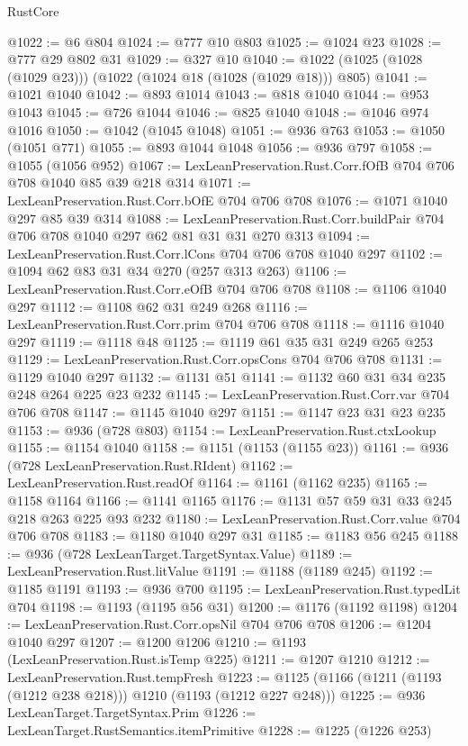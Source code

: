 \begin{lexlean}{RustCore}
\begin{coremodule}
@1022 := @6 @804
@1024 := @777 @10 @803
@1025 := @1024 @23
@1028 := @777 @29 @802 @31
@1029 := @327 @10
@1040 := @1022 (@1025 (@1028 (@1029 @23))) (@1022 (@1024 @18 (@1028 (@1029 @18))) @805)
@1041 := @1021 @1040
@1042 := @893 @1014
@1043 := @818 @1040
@1044 := @953 @1043
@1045 := @726 @1044
@1046 := @825 @1040
@1048 := @1046 @974 @1016
@1050 := @1042 (@1045 @1048)
@1051 := @936 @763
@1053 := @1050 (@1051 @771)
@1055 := @893 @1044 @1048
@1056 := @936 @797
@1058 := @1055 (@1056 @952)
@1067 := LexLeanPreservation.Rust.Corr.fOfB @704 @706 @708 @1040 @85 @39 @218 @314
@1071 := LexLeanPreservation.Rust.Corr.bOfE @704 @706 @708
@1076 := @1071 @1040 @297 @85 @39 @314
@1088 := LexLeanPreservation.Rust.Corr.buildPair @704 @706 @708 @1040 @297 @62 @81 @31 @31 @270 @313
@1094 := LexLeanPreservation.Rust.Corr.lCons @704 @706 @708 @1040 @297
@1102 := @1094 @62 @83 @31 @34 @270 (@257 @313 @263)
@1106 := LexLeanPreservation.Rust.Corr.eOfB @704 @706 @708
@1108 := @1106 @1040 @297
@1112 := @1108 @62 @31 @249 @268
@1116 := LexLeanPreservation.Rust.Corr.prim @704 @706 @708
@1118 := @1116 @1040 @297
@1119 := @1118 @48
@1125 := @1119 @61 @35 @31 @249 @265 @253
@1129 := LexLeanPreservation.Rust.Corr.opsCons @704 @706 @708
@1131 := @1129 @1040 @297
@1132 := @1131 @51
@1141 := @1132 @60 @31 @34 @235 @248 @264 @225 @23 @232
@1145 := LexLeanPreservation.Rust.Corr.var @704 @706 @708
@1147 := @1145 @1040 @297
@1151 := @1147 @23 @31 @23 @235
@1153 := @936 (@728 @803)
@1154 := LexLeanPreservation.Rust.ctxLookup
@1155 := @1154 @1040
@1158 := @1151 (@1153 (@1155 @23))
@1161 := @936 (@728 LexLeanPreservation.Rust.RIdent)
@1162 := LexLeanPreservation.Rust.readOf
@1164 := @1161 (@1162 @235)
@1165 := @1158 @1164
@1166 := @1141 @1165
@1176 := @1131 @57 @59 @31 @33 @245 @218 @263 @225 @93 @232
@1180 := LexLeanPreservation.Rust.Corr.value @704 @706 @708
@1183 := @1180 @1040 @297 @31
@1185 := @1183 @56 @245
@1188 := @936 (@728 LexLeanTarget.TargetSyntax.Value)
@1189 := LexLeanPreservation.Rust.litValue
@1191 := @1188 (@1189 @245)
@1192 := @1185 @1191
@1193 := @936 @700
@1195 := LexLeanPreservation.Rust.typedLit @704
@1198 := @1193 (@1195 @56 @31)
@1200 := @1176 (@1192 @1198)
@1204 := LexLeanPreservation.Rust.Corr.opsNil @704 @706 @708
@1206 := @1204 @1040 @297
@1207 := @1200 @1206
@1210 := @1193 (LexLeanPreservation.Rust.isTemp @225)
@1211 := @1207 @1210
@1212 := LexLeanPreservation.Rust.tempFresh
@1223 := @1125 (@1166 (@1211 (@1193 (@1212 @238 @218))) @1210 (@1193 (@1212 @227 @248)))
@1225 := @936 LexLeanTarget.TargetSyntax.Prim
@1226 := LexLeanTarget.RustSemantics.itemPrimitive
@1228 := @1225 (@1226 @253)

\end{coremodule}
\end{lexlean}

